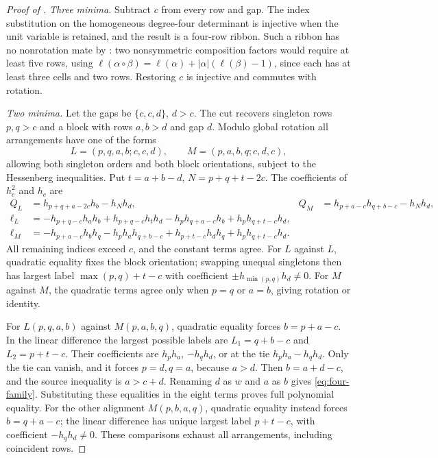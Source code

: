 \documentclass[11pt,a4paper]{amsart}
\numberwithin{equation}{section}
\theoremstyle{plain}
\theoremstyle{definition}
\begin{document}
\begin{proof}[Proof of ]
\emph{Three minima.}
Subtract \(c\) from every row and gap.  The index substitution on the
homogeneous degree-four determinant is injective when the unit variable
is retained, and the result is a four-row ribbon.  Such a ribbon has no
nonrotation mate by \cite{Billera2006DecomposableCompositions}:
two nonsymmetric composition factors would require at least five rows,
using \(\ell(\alpha\circ\beta)=\ell(\alpha)+|\alpha|(\ell(\beta)-1)\),
since each has at least three cells and two rows.
Restoring \(c\) is injective and commutes with rotation.

\emph{Two minima.}
Let the gaps be \(\{c,c,d\}\), \(d>c\).  The cut recovers singleton
rows \(p,q>c\) and a block with rows \(a,b>d\) and gap \(d\).
Modulo global rotation all arrangements have one of the forms
\[
 L=(p,q,a,b;c,c,d),\qquad M=(p,a,b,q;c,d,c),
\]
allowing both singleton orders and both block orientations, subject to
the Hessenberg inequalities.  Put \(t=a+b-d\), \(N=p+q+t-2c\).
The coefficients of \(h_c^2\) and \(h_c\) are
\begin{align*}
 Q_L&=h_{p+q+a-2c}h_b-h_Nh_d,&
 Q_M&=h_{p+a-c}h_{q+b-c}-h_Nh_d,\\
 \ell_L&=-h_{p+q-c}h_ah_b+h_{p+q-c}h_th_d
          -h_ph_{q+a-c}h_b+h_ph_{q+t-c}h_d,\\
 \ell_M&=-h_{p+a-c}h_bh_q-h_ph_ah_{q+b-c}
          +h_{p+t-c}h_dh_q+h_ph_{q+t-c}h_d.
\end{align*}
All remaining indices exceed \(c\), and the constant terms agree.
For \(L\) against \(L\), quadratic equality fixes the block orientation;
swapping unequal singletons then has largest label
\(\max(p,q)+t-c\) with coefficient \(\pm h_{\min(p,q)}h_d\ne0\).
For \(M\) against \(M\), the quadratic terms agree only when
\(p=q\) or \(a=b\), giving rotation or identity.

For \(L(p,q,a,b)\) against \(M(p,a,b,q)\), quadratic equality forces
\(b=p+a-c\).  In the linear difference the largest possible labels
are \(L_1=q+b-c\) and \(L_2=p+t-c\).  Their coefficients are
\(h_ph_a\), \(-h_qh_d\), or at the tie \(h_ph_a-h_qh_d\).
Only the tie can vanish, and it forces \(p=d,q=a\), because \(a>d\).
Then \(b=a+d-c\), and the source inequality is \(a>c+d\).
Renaming \(d\) as \(w\) and \(a\) as \(b\) gives
\eqref{eq:four-family}.  Substituting these equalities in the eight
terms proves full polynomial equality.
For the other alignment \(M(p,b,a,q)\), quadratic equality instead
forces \(b=q+a-c\); the linear difference has unique largest label
\(p+t-c\), with coefficient \(-h_qh_d\ne0\).
These comparisons exhaust all arrangements, including coincident rows.


\end{proof}
\end{document}
